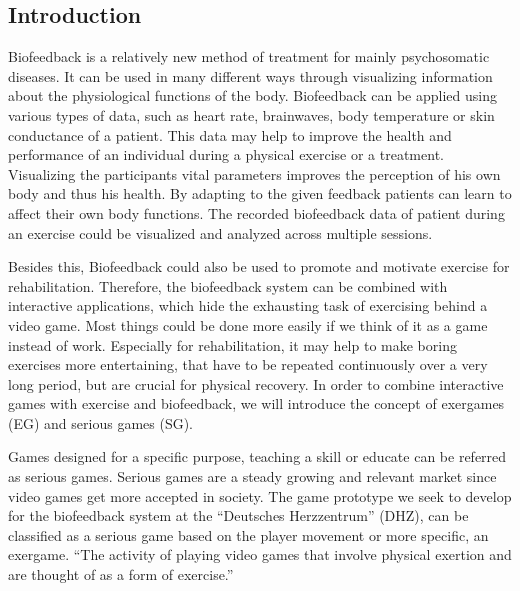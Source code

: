 \begin{multicols}{2}

\section{Introduction}
Biofeedback is a relatively new method of treatment for mainly psychosomatic diseases. It can be used in many different ways through visualizing information about the physiological functions of the body. Biofeedback can be applied using various types of data, such as heart rate, brainwaves, body temperature or skin conductance of a patient. This data may help to improve the health and performance of an individual during a physical exercise or a treatment. Visualizing the participants vital parameters improves the perception of his own body and thus his health. By adapting to the given feedback patients can learn to affect their own body functions.\cite{BF2007} The recorded biofeedback data of patient during an exercise could be visualized and analyzed across multiple sessions. 

Besides this, Biofeedback could also be used to promote and motivate exercise for rehabilitation. Therefore, the biofeedback system can be combined with interactive applications, which hide the exhausting task of exercising behind a video game. Most things could be done more easily if we think of it as a game instead of work. Especially for rehabilitation, it may help to make boring exercises more entertaining, that have to be repeated continuously over a very long period, but are crucial for physical recovery. In order to combine interactive games with
exercise and biofeedback, we will introduce the concept of exergames (EG) and serious games (SG).

Games designed for a specific purpose, teaching a skill or educate can be referred as serious games. \cite{Derryberry} Serious games are a steady growing and relevant market since video games get more accepted in society. \cite{SGIndustry} The game prototype we seek to develop for the biofeedback system at the “Deutsches Herzzentrum” (DHZ), can be classified as a serious game based on the player movement or more specific, an exergame. “The activity of playing video games that involve physical exertion and are thought of as a form of exercise.” \cite{ExergameDef}


\end{multicols}
